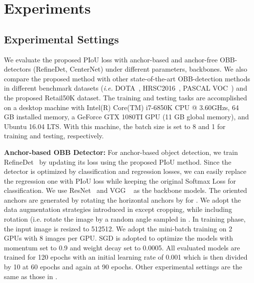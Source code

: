 \section{Experiments}
\label{exp}
\subsection{Experimental Settings}
We evaluate the proposed PIoU loss with anchor-based and anchor-free OBB-detectors (RefineDet, CenterNet) under different parameters, backbones. We also compare the proposed method with other state-of-the-art OBB-detection methods in different benchmark datasets (\textit{i.e.} DOTA~\cite{Xia2018DAS}, HRSC2016~\cite{Liu2016SRB}, PASCAL VOC~\cite{Everingham2015TPV}) and the proposed Retail50K dataset. The training and testing tasks are accomplished on a desktop machine with Intel(R) Core(TM) i7-6850K CPU @ 3.60GHzs, 64 GB installed memory, a GeForce GTX 1080TI GPU (11 GB global memory), and Ubuntu 16.04 LTS. With this machine, the batch size is set to 8 and 1 for training and testing, respectively.

\noindent\textbf{Anchor-based OBB Detector:}
\label{approach:anchorbased}
For anchor-based object detection, we train RefineDet~\cite{refinedet} by updating its loss using the proposed PIoU method. Since the detector is optimized by classification and regression losses, we can easily replace the regression one with PIoU loss  while keeping the original Softmax Loss  for classification. We use ResNet~\cite{He2016DRL} and VGG ~\cite{Simonyan2014VDC} as the backbone models. The oriented anchors are generated by rotating the horizontal anchors by  for . We adopt the data augmentation strategies introduced in \cite{Liu2016SSS} except cropping, while including rotation (i.e. rotate the image by a random angle sampled in . In training phase, the input image is resized to 512512. We adopt the mini-batch training on 2 GPUs with 8 images per GPU. SGD is adopted to optimize the models with momentum set to 0.9 and weight decay set to 0.0005. All evaluated models are trained for 120 epochs with an initial learning rate of 0.001 which is then divided by 10 at 60 epochs and again at 90 epochs. Other experimental settings are the same as those in \cite{refinedet}.

